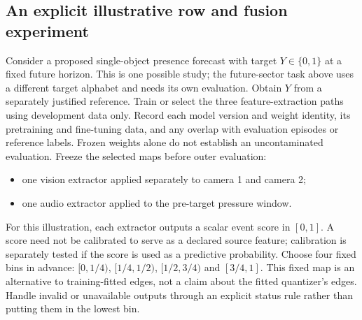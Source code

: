 \documentclass[11pt,a4paper]{article}
\providecommand{\tightlist}{\setlength{\itemsep}{0pt}\setlength{\parskip}{0pt}}
\begin{document}
\par{}

\subsection{An explicit illustrative row and fusion experiment}\label{an-explicit-illustrative-row-and-fusion-experiment}

Consider a proposed single-object presence forecast with target \(Y\in\{0,1\}\) at a fixed future horizon. This is one possible study; the future-sector task above uses a different target alphabet and needs its own evaluation. Obtain \(Y\) from a separately justified reference. Train or select the three feature-extraction paths using development data only. Record each model version and weight identity, its pretraining and fine-tuning data, and any overlap with evaluation episodes or reference labels. Frozen weights alone do not establish an uncontaminated evaluation. Freeze the selected maps before outer evaluation:

\begin{itemize}
\tightlist
\item
  one vision extractor applied separately to camera 1 and camera 2;
\item
  one audio extractor applied to the pre-target pressure window.
\end{itemize}

For this illustration, each extractor outputs a scalar event score in \([0,1]\). A score need not be calibrated to serve as a declared source feature; calibration is separately tested if the score is used as a predictive probability. Choose four fixed bins in advance: \([0,1/4)\), \([1/4,1/2)\), \([1/2,3/4)\) and \([3/4,1]\). This fixed map is an alternative to training-fitted edges, not a claim about the fitted quantizer's edges. Handle invalid or unavailable outputs through an explicit status rule rather than putting them in the lowest bin.
\end{document}
